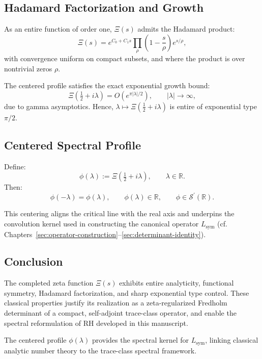\subsection*{Hadamard Factorization and Growth}

As an entire function of order one, \( \Xi(s) \) admits the Hadamard product:
\[
\Xi(s) = e^{C_0 + C_1 s} \prod_\rho \left( 1 - \frac{s}{\rho} \right) e^{s/\rho},
\]
with convergence uniform on compact subsets, and where the product is over nontrivial zeros \( \rho \).

The centered profile satisfies the exact exponential growth bound:
\[
\Xi\left( \tfrac{1}{2} + i\lambda \right) = O\left( e^{\pi |\lambda| / 2} \right), \qquad |\lambda| \to \infty,
\]
due to gamma asymptotics. Hence, \( \lambda \mapsto \Xi(\tfrac{1}{2} + i\lambda) \) is entire of exponential type \( \pi/2 \).

\subsection*{Centered Spectral Profile}

Define:
\[
\phi(\lambda) := \Xi\left( \tfrac{1}{2} + i\lambda \right), \qquad \lambda \in \mathbb{R}.
\]
Then:
\[
\phi(-\lambda) = \phi(\lambda), \qquad \phi(\lambda) \in \mathbb{R}, \qquad \phi \in \mathcal{S}^\prime(\mathbb{R}).
\]

This centering aligns the critical line with the real axis and underpins the convolution kernel used in constructing the canonical operator \( L_{\mathrm{sym}} \) (cf. Chapters~\ref{sec:operator-construction}–\ref{sec:determinant-identity}).

\subsection*{Conclusion}

The completed zeta function \( \Xi(s) \) exhibits entire analyticity, functional symmetry, Hadamard factorization, and sharp exponential type control. These classical properties justify its realization as a zeta-regularized Fredholm determinant of a compact, self-adjoint trace-class operator, and enable the spectral reformulation of RH developed in this manuscript.

The centered profile \( \phi(\lambda) \) provides the spectral kernel for \( L_{\mathrm{sym}} \), linking classical analytic number theory to the trace-class spectral framework.
